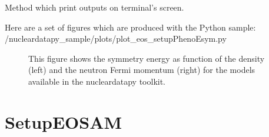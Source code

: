 \documentclass[letterpaper,10pt,english]{sphinxmanual}
\begin{document}
\begin{fulllineitems}
\begin{fulllineitems}
\end{fulllineitems}


\begin{fulllineitems}
\label{\detokenize{source/api/setup_eos_pheno_esym:nucleardatapy.eos.setup_pheno_esym.setupPhenoEsym.print_outputs}}
\pysigstartsignatures
{}
\pysigstopsignatures
\sphinxAtStartPar
Method which print outputs on terminal’s screen.

\end{fulllineitems}


\end{fulllineitems}


\sphinxAtStartPar
Here are a set of figures which are produced with the Python sample: /nucleardatapy\_sample/plots/plot\_eos\_setupPhenoEsym.py

\begin{figure}[htbp]
\centering
\capstart

\noindent{}
\caption{This figure shows the symmetry energy as function of the density (left) and the neutron Fermi momentum (right) for the models available in the nucleardatapy toolkit.}\label{\detokenize{source/api/setup_eos_pheno_esym:id1}}\end{figure}

\sphinxstepscope


\section{SetupEOSAM}
\label{\detokenize{source/api/setup_eos_am:setupeosam}}\label{\detokenize{source/api/setup_eos_am::doc}}\label{\detokenize{source/api/setup_eos_am:module-nucleardatapy.eos.setup_am}}
\end{document}
